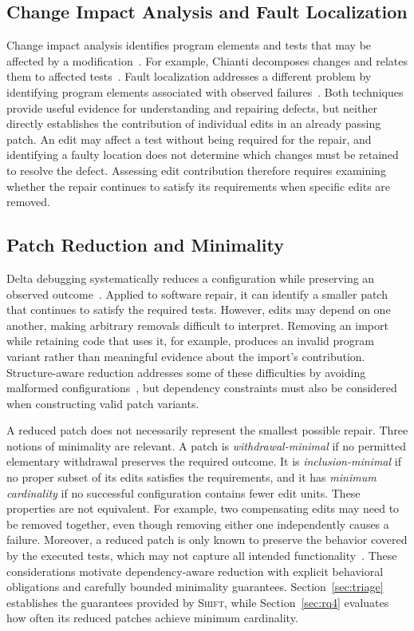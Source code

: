 \documentclass[a4paper,fleqn]{cas-sc}
\newcommand{\tool}{\textsc{Shift}}
\begin{document}
\subsection{Change Impact Analysis and Fault Localization}
\label{sec:foundations}

Change impact analysis identifies program elements and tests that may be affected by a modification~\citep{li2013cia,orso2003field}. For example, Chianti decomposes changes and relates them to affected tests~\citep{ren2004chianti}. Fault localization addresses a different problem by identifying program elements associated with observed failures~\citep{wong2016fl}. Both techniques provide useful evidence for understanding and repairing defects, but neither directly establishes the contribution of individual edits in an already passing patch. An edit may affect a test without being required for the repair, and identifying a faulty location does not determine which changes must be retained to resolve the defect. Assessing edit contribution therefore requires examining whether the repair continues to satisfy its requirements when specific edits are removed.


\subsection{Patch Reduction and Minimality}
\label{sec:reduction}

Delta debugging systematically reduces a configuration while preserving an observed outcome~\citep{zeller1999yesterday,zeller2002ddmin}. Applied to software repair, it can identify a smaller patch that continues to satisfy the required tests. However, edits may depend on one another, making arbitrary removals difficult to interpret. Removing an import while retaining code that uses it, for example, produces an invalid program variant rather than meaningful evidence about the import's contribution. Structure-aware reduction addresses some of these difficulties by avoiding malformed configurations~\citep{misherghi2006hdd}, but dependency constraints must also be considered when constructing valid patch variants.

A reduced patch does not necessarily represent the smallest possible repair. Three notions of minimality are relevant. A patch is \emph{withdrawal-minimal} if no permitted elementary withdrawal preserves the required outcome. It is \emph{inclusion-minimal} if no proper subset of its edits satisfies the requirements, and it has \emph{minimum cardinality} if no successful configuration contains fewer edit units. These properties are not equivalent. For example, two compensating edits may need to be removed together, even though removing either one independently causes a failure. Moreover, a reduced patch is only known to preserve the behavior covered by the executed tests, which may not capture all intended functionality~\citep{barr2015oracle}. These considerations motivate dependency-aware reduction with explicit behavioral obligations and carefully bounded minimality guarantees. Section~\ref{sec:triage} establishes the guarantees provided by \tool{}, while Section~\ref{sec:rq4} evaluates how often its reduced patches achieve minimum cardinality.
\end{document}
